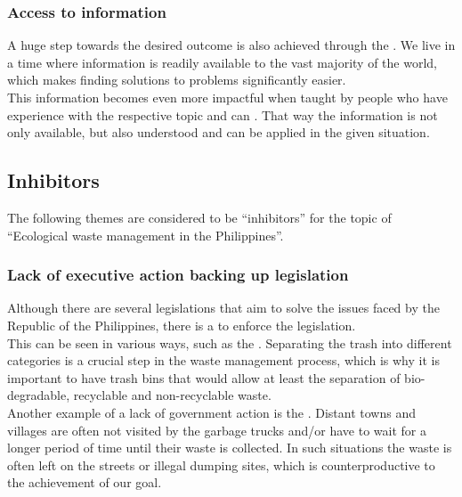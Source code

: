 \documentclass{article}
\newcommand{\nn}{\vspace{\baselineskip}\\}
\newcommand{\hletheme}[1]{\textbf{\color{teal}{#1}}}
\newcommand{\hlitheme}[1]{\textbf{\color{purple}{#1}}}
\begin{document}
\subsubsection{Access to information}
\label{subsubsec:access-to-information}
A huge step towards the desired outcome is also achieved through the
\hletheme{globally available access to information}. We live in a time
where information is readily available to the vast majority of the world,
which makes finding solutions to problems significantly easier.
\nn
This information becomes even more impactful when taught by people who
have experience with the respective topic and can \hletheme{share the 
knowledge through education}.
That way the information is not only available, but also understood and
can be applied in the given situation.

\subsection{Inhibitors}
The following themes are considered to be ``inhibitors'' for the topic of
``Ecological waste management in the Philippines''.

\subsubsection{Lack of executive action backing up legislation}
\label{subsubsec:lack-of-executive-action-backing-up-legislation}
Although there are several legislations that aim to solve the issues
faced by the Republic of the Philippines, there is a \hlitheme{lack 
of government action} to enforce the legislation.
\nn
This can be seen in various ways, such as the \hlitheme{need for more
designated trash bins}.
Separating the trash into different categories is a crucial step in
the waste management process, which is why it is important to have
trash bins that would allow at least the separation of bio-degradable,
recyclable and non-recyclable waste.
\nn
Another example of a lack of government action is the \hlitheme{poor
garbage collection schedule and system}.
Distant towns and villages are often not visited by the garbage trucks
and/or have to wait for a longer period of time until their
waste is collected.
In such situations the waste is often left on the streets or
illegal dumping sites, which is counterproductive to the achievement
of our goal.

\end{document}
